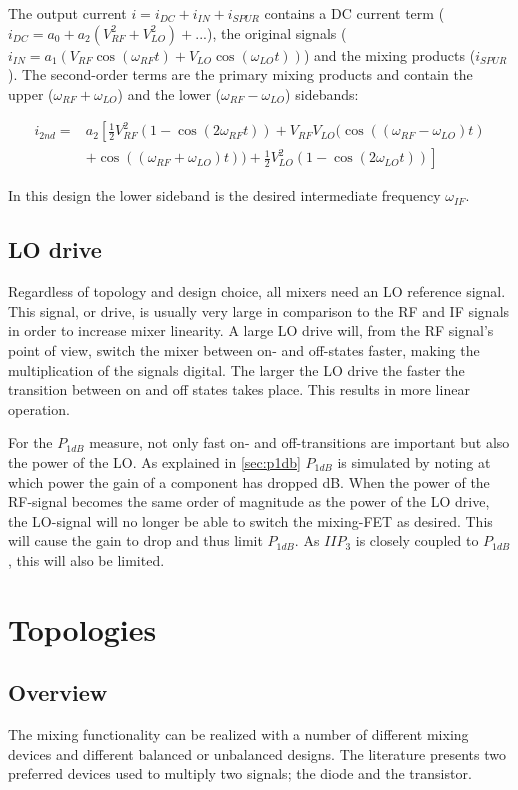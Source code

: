 			The output current $i=i_{DC}+i_{IN}+i_{SPUR}$ contains a DC current term ($i_{DC} = a_0 + a_2(V_{RF}^2+V_{LO}^2)+...$), the original signals ($i_{IN}=a_1(V_{RF}\cos(\omega_{RF}t) + V_{LO}\cos(\omega_{LO}t))$) and the mixing products ($i_{SPUR}$). The second-order terms are the primary mixing products and contain the upper ($\omega_{RF}+\omega_{LO}$) and the lower ($\omega_{RF}-\omega_{LO}$) sidebands:

			\begin{align}\label{eq:mixedsecondorder}
				i_{2nd} = &a_2 \left [ \frac{1}{2}V^2_{RF}(1-\cos(2\omega_{RF}t)) + V_{RF}V_{LO}(\cos((\omega_{RF}-\omega_{LO})t) \right. \nonumber \\
				&\left. + \cos((\omega_{RF}+\omega_{LO})t)) + \frac{1}{2}V^2_{LO}(1-\cos(2\omega_{LO}t)) \right]
			\end{align}

			In this design the lower sideband is the desired intermediate frequency $\omega_{IF}$.

		\subsection{LO drive}\label{sec:mixer_lodrive}
			Regardless of topology and design choice, all mixers need an LO reference signal. This signal, or drive, is usually very large in comparison to the RF and IF signals in order to increase mixer linearity. A large LO drive will, from the RF signal's point of view, switch the mixer between on- and off-states faster, making the multiplication of the signals digital. The larger the LO drive the faster the transition between on and off states takes place. This results in more linear operation.\autocite{maas92}

			For the $P_{1dB}$ measure, not only fast on- and off-transitions are important but also the power of the LO. As explained in \autoref{sec:p1db} $P_{1dB}$ is simulated by noting at which power the gain of a component has dropped \unit[1]{dB}. When the power of the RF-signal becomes the same order of magnitude as the power of the LO drive, the LO-signal will no longer be able to switch the mixing-FET as desired. This will cause the gain to drop and thus limit $P_{1dB}$. As $IIP_3$ is closely coupled to $P_{1dB}$, this will also be limited.\autocite{kundert02}

	\section{Topologies}
		\subsection{Overview}
			The mixing functionality can be realized with a number of different mixing devices and different balanced or unbalanced designs. The literature presents two preferred devices used to multiply two signals; the diode and the transistor.\autocite{norman2002design}

